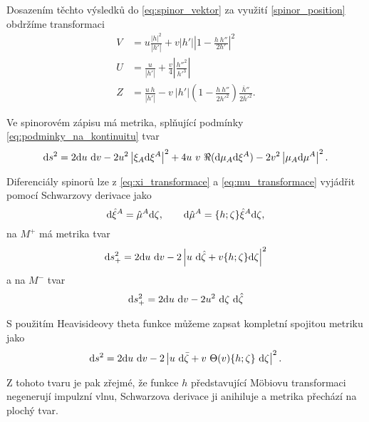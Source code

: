 Dosazením těchto výsledků do \eqref{eq:spinor_vektor} za využití \eqref{spinor_position} obdržíme
transformaci
\begin{equation}
    \begin{split}
        V &= u \frac{\left|h\right|^2}{\left|h'\right|} + v \left| h' \right| \left| 1 - \frac{h ~ h''}{2 h'} \right|^2 \\
        U &= \frac{u}{\left|h'\right|} + \frac{v}{4} \left| \frac{h''^2}{h'^3}\right| \\
        Z &= \frac{u ~ h}{ \left| h' \right|} - v ~ \left| h' \right| \left(1 - \frac{h ~ h''}{2 h'^2} \right) \frac{\bar{h}''}{2 \bar{h}'^2}.
    \end{split}
\end{equation}

Ve spinorovém zápisu má metrika, splňující podmínky \eqref{eq:podminky_na_kontinuitu} tvar
\begin{equation}
    \mathrm{d} s^2 = 2 \mathrm{d} u ~ \mathrm{d} v - 2 u^2 \left| \xi_A \mathrm{d} \xi^A \right|^2 + 4 u~v~ \Re(\mathrm{d} \mu_A \mathrm{d} \xi^A) - 2 v^2 \left|\mu_A \mathrm{d} \mu^A\right|^2.
\end{equation}

Diferenciály spinorů lze z \eqref{eq:xi_transformace} a \eqref{eq:mu_transformace} vyjádřit pomocí Schwarzovy derivace jako
\begin{equation}
    \mathrm{d} \hat{\xi}^A = \hat{\mu}^A \mathrm{d} \zeta, ~~~~~~ \mathrm{d} \hat{\mu}^A = \{h; \zeta\} \hat{\xi}^A \mathrm{d} \zeta,
\end{equation}
na $M^+$ má metrika tvar
\begin{equation}
    \mathrm{d} s_+^2 = 2 \mathrm{d} u ~ \mathrm{d} v - 2 \left| u ~ \mathrm{d} \hat{\zeta} + v \{h; \zeta \} \mathrm{d} \zeta \right|^2
\end{equation}
a na $M^-$ tvar
\begin{equation}
    \mathrm{d} s_+^2 = 2 \mathrm{d} u ~ \mathrm{d} v - 2 u^2 ~ \mathrm{d} \zeta ~ \mathrm{d} \hat{\zeta}
\end{equation}

S použitím Heavisideovy theta funkce můžeme zapsat kompletní spojitou metriku
jako
\begin{equation}
    \mathrm{d} s^2 = 2 \mathrm{d} u ~ \mathrm{d} v - 2 \left| u ~ \mathrm{d} \bar{\zeta} + v ~ \Theta(v) \{h;\zeta\} ~ \mathrm{d} \zeta \right|^2.
\end{equation}

Z tohoto tvaru je pak zřejmé, že funkce $h$ představující Möbiovu transformaci negenerují impulzní vlnu,
Schwarzova derivace ji anihiluje a metrika přechází na plochý tvar.

